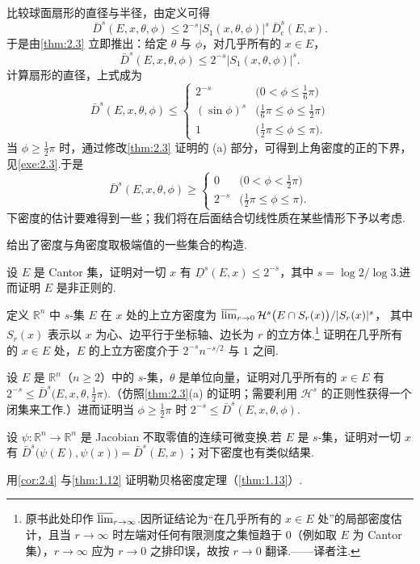 比较球面扇形的直径与半径，由定义可得
\[
  \bar{D}^{s}(E,x,\theta,\phi)\leq 2^{-s}|S_1(x,\theta,\phi)|^{s}\,\bar{D}^{s}_{\mathrm{c}}(E,x).
\]
于是由\cref{thm:2.3} 立即推出：给定 $\theta$ 与 $\phi$，对几乎所有的 $x\in E$，
\[
  \bar{D}^{s}(E,x,\theta,\phi)\leq 2^{-s}|S_1(x,\theta,\phi)|^{s}.
\]
计算扇形的直径，上式成为
\[
  \bar{D}^{s}(E,x,\theta,\phi)\leq
  \begin{cases}
    2^{-s} & \bigl(0<\phi\leq\tfrac{1}{6}\pi\bigr)\\
    (\sin\phi)^{s} & \bigl(\tfrac{1}{6}\pi\leq\phi\leq\tfrac{1}{2}\pi\bigr)\\
    1 & \bigl(\tfrac{1}{2}\pi\leq\phi\leq\pi\bigr).
  \end{cases}
\]
当 $\phi\geq\frac{1}{2}\pi$ 时，通过修改\cref{thm:2.3} 证明的 (a) 部分，可得到上角密度的正的下界，见\cref{exe:2.3}.于是
\[
  \bar{D}^{s}(E,x,\theta,\phi)\geq
  \begin{cases}
    0 & \bigl(0<\phi<\tfrac{1}{2}\pi\bigr)\\
    2^{-s} & \bigl(\tfrac{1}{2}\pi\leq\phi\leq\pi\bigr).
  \end{cases}
\]
下密度的估计要难得到一些；我们将在后面结合切线性质在某些情形下予以考虑.

\textcite{morgan1935,gillis1935,besicovitch1938,dickinson1939} 给出了密度与角密度取极端值的一些集合的构造.

\begin{exercises}
\item 设 $E$ 是 Cantor 集，证明对一切 $x$ 有 $\underline{D}^s(E,x)\leq 2^{-s}$，其中 $s=\log 2/\log 3$.进而证明 $E$ 是非正则的.
\item 定义 $\mathbb{R}^n$ 中 $s$-集 $E$ 在 $x$ 处的上立方密度为
$\varlimsup_{r\to 0}\mathcal{H}^s\bigl(E\cap S_r(x)\bigr)/|S_r(x)|^s$，
其中 $S_r(x)$ 表示以 $x$ 为心、边平行于坐标轴、边长为 $r$ 的立方体.\footnote{原书此处印作 $\varlimsup_{r\to\infty}$.因所证结论为``在几乎所有的 $x\in E$ 处''的局部密度估计，且当 $r\to\infty$ 时左端对任何有限测度之集恒趋于 $0$（例如取 $E$ 为 Cantor 集），$r\to\infty$ 应为 $r\to 0$ 之排印误，故按 $r\to 0$ 翻译.——译者注.}
证明在几乎所有的 $x\in E$ 处，$E$ 的上立方密度介于 $2^{-s}n^{-s/2}$ 与 $1$ 之间.
\item 设 $E$ 是 $\mathbb{R}^n$（$n\geq 2$）中的 $s$-集，$\theta$ 是单位向量，证明对几乎所有的 $x\in E$ 有 $2^{-s}\leq\bar{D}^s\bigl(E,x,\theta,\tfrac{1}{2}\pi\bigr)$.（仿照\cref{thm:2.3}(a) 的证明；需要利用 $\mathcal{H}^s$ 的正则性获得一个闭集来工作.）进而证明当 $\phi\geq\frac{1}{2}\pi$ 时 $2^{-s}\leq\bar{D}^s(E,x,\theta,\phi)$.
\item 设 $\psi:\mathbb{R}^n\to\mathbb{R}^n$ 是 Jacobian 不取零值的连续可微变换.若 $E$ 是 $s$-集，证明对一切 $x$ 有 $\bar{D}^s\bigl(\psi(E),\psi(x)\bigr)=\bar{D}^s(E,x)$；对下密度也有类似结果.
\item 用\cref{cor:2.4} 与\cref{thm:1.12} 证明勒贝格密度定理（\cref{thm:1.13}）.
\end{exercises}
